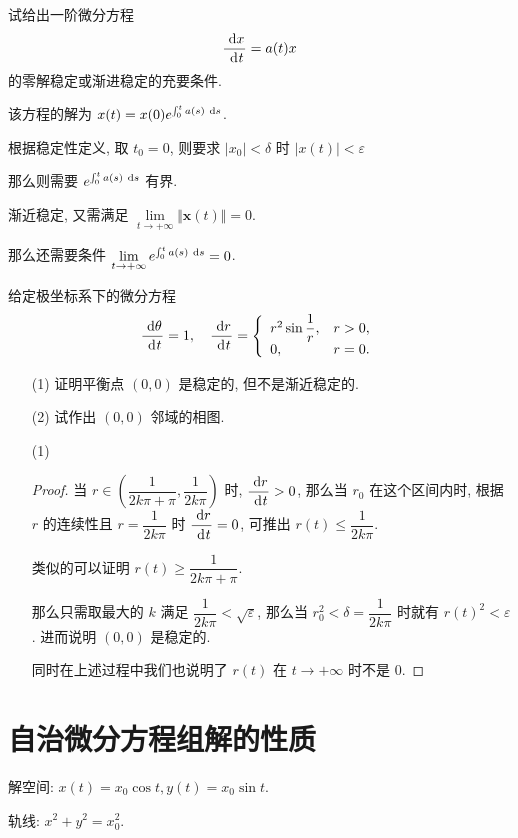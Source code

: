 \begin{practice}
\problem 试给出一阶微分方程 $$\dfrac{\ \text {d} x^{}}{\ \text {d}^{} t}=a(t)x$$ 的零解稳定或渐进稳定的充要条件.
\begin{solution}
	该方程的解为 $x(t)=x(0)e^{\int_0^t a(s)\ \text {d} s}$.

	根据稳定性定义, 取 $t_0=0$, 则要求 $|x_0|<\delta$ 时 $|x(t)|<\varepsilon$

	那么则需要 $e^{\int_0^t a(s)\ \text {d} s}$ 有界.

	渐近稳定, 又需满足 $\lim\limits_{t\to+\infty}\Vert \bm x(t)\Vert=0$.

	那么还需要条件 $\lim\limits_{t\to+\infty}e^{\int_0^t a(s)\ \text {d} s}=0$.
\end{solution}
\problem 给定极坐标系下的微分方程 $$\dfrac{\ \text {d} \theta^{}}{\ \text {d}^{} t}=1,\quad \dfrac{\ \text {d} r^{}}{\ \text {d}^{} t}=\left\{\begin{array}{ll}
	r^2\sin\dfrac 1 r, & r>0,\\
	0, & r=0.
\end{array}\right.$$
\begin{itemize}
	\item[(1)] 证明平衡点 $(0,0)$ 是稳定的, 但不是渐近稳定的.
	\item[(2)] 试作出 $(0,0)$ 邻域的相图.
\end{itemize}

\begin{itemize}
	\item[(1)]
	\begin{proof}
		当 $r\in(\dfrac{1}{2k\pi+\pi},\dfrac{1}{2k\pi})$ 时, $\dfrac{\ \text {d} r^{}}{\ \text {d}^{} t}>0$, 那么当 $r_0$ 在这个区间内时, 根据 $r$ 的连续性且 $r=\dfrac 1{2k\pi}$ 时 $\dfrac{\ \text {d} r^{}}{\ \text {d}^{} t}=0$, 可推出 $r(t)\leqslant \dfrac{1}{2k\pi}$.

		类似的可以证明 $r(t)\geqslant\dfrac{1}{2k\pi+\pi}$.

		那么只需取最大的 $k$ 满足 $\dfrac 1{2k\pi}<\sqrt{\varepsilon}$, 那么当 $r_0^2<\delta=\dfrac 1{2k\pi}$ 时就有 $r(t)^2<\varepsilon$. 进而说明 $(0,0)$ 是稳定的.

		同时在上述过程中我们也说明了 $r(t)$ 在 $t\to+\infty$ 时不是 $0$.
	\end{proof}
\end{itemize}
\end{practice}

\section{自治微分方程组解的性质}


\begin{practice}
\problem
\begin{solution}
	解空间: $x(t)=x_0\cos t,y(t)=x_0\sin t$.

	轨线: $x^2+y^2=x_0^2$.
\end{solution}
\problem
\begin{solution}

\end{solution}
\end{practice}